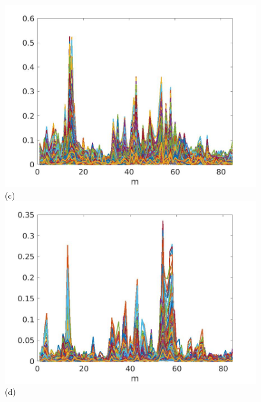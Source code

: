 \documentclass[journal]{IEEEtran}
\begin{document}
\begin{figure}[htp!]
\includegraphics[scale=.12]{../../figs/J3_VH_sqrdif_change_locations}(c)
\includegraphics[scale=.12]{../../figs/consecdif_J3_VH_sqrdif_change_locations}(d)


\end{figure}
\end{document}

